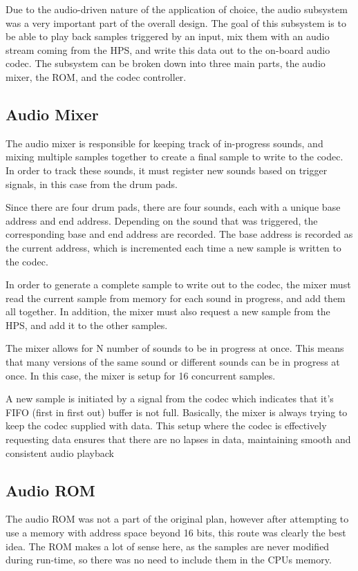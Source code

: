 \documentclass{subfile}
\begin{document}
  Due to the audio-driven nature of the application of choice, the audio subsystem
  was a very important part of the overall design. 
  The goal of this subsystem is to be able to play back samples triggered 
  by an input, mix them with an audio stream coming from the HPS, and write this 
  data out to the on-board audio codec.
  The subsystem can be broken down into three main parts, the audio mixer, the ROM, and the 
  codec controller.

  \subsection{Audio Mixer}
  The audio mixer is responsible for keeping track of in-progress sounds,
  and mixing multiple samples together to create a final sample to write to the codec.
  In order to track these sounds, it must register new sounds based on trigger 
  signals, in this case from the drum pads.

  Since there are four drum pads, there are four sounds, each with a unique base 
  address and end address. 
  Depending on the sound that was triggered, the corresponding base and end address are recorded. 
  The base address is recorded as the current address, which is incremented each time a new 
  sample is written to the codec.

  In order to generate a complete sample to write out to the codec, the mixer must read the current 
  sample from memory for each sound in progress, and add them all together.
  In addition, the mixer must also request a new sample from the HPS, and add it to the other 
  samples.

  The mixer allows for N number of sounds to be in progress at once. 
  This means that many versions of the same sound or different sounds can be in progress at once.
  In this case, the mixer is setup for 16 concurrent samples.

  A new sample is initiated by a signal from the codec which indicates that it's FIFO (first 
  in first out) 
  buffer is not full. 
  Basically, the mixer is always trying to keep the codec supplied with data. 
  This setup where the codec is effectively requesting data ensures that there are no lapses in data, 
  maintaining smooth and consistent audio playback

  \subsection{Audio ROM}
  The audio ROM was not a part of the original plan, however after attempting to 
  use a memory with address space beyond 16 bits, this route was clearly the best 
  idea. 
  The ROM makes a lot of sense here, as the samples are never modified during 
  run-time, so there was no need to include them in the CPUs memory.
\end{document}
